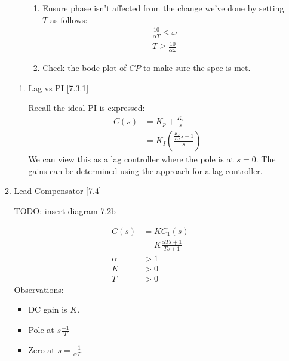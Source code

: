 \begin{enumerate}
\begin{enumerate}
\begin{itemize}
\begin{enumerate}
                            \item Ensure phase isn't affected from the change we've done by setting $T$ as follows:
                                \begin{align*}
                                    \frac{10}{\alpha T} \le \omega \\
                                    T \ge \frac{10}{\alpha \omega}
                                \end{align*}


                            \item Check the bode plot of $CP$ to make sure the spec is met.
                        \end{enumerate}

                \end{itemize}
                \begin{enumerate}
                    \item Lag vs PI [7.3.1]

                        Recall the ideal PI is expressed:
                        \begin{align*}
                            C(s) &= K_p + \frac{K_i}{s} \\
                            &= K_I \left( \frac{\frac{K_P}{K_I}s + 1}{s}\right)
                        \end{align*}
                        We can view this as a lag controller where the pole is at $s = 0$.
                        The gains can be determined using the approach for a lag controller.
                \end{enumerate}
            \item Lead Compensator [7.4]

                TODO: insert diagram 7.2b

                \begin{align*}
                    C(s) &= K C_1(s) \\
                    &= K \frac{\alpha T s + 1}{T s + 1} \\
                    \alpha &> 1 \\ %
                    K &> 0 \\
                    T &> 0
                \end{align*}
                Observations:
                \begin{itemize}
                    \item DC gain is $K$.
                    \item Pole at $s \frac{-1}{T}$
                    \item Zero at $s = \frac{-1}{\alpha T}$


\end{itemize}
\end{enumerate}
\end{enumerate}
